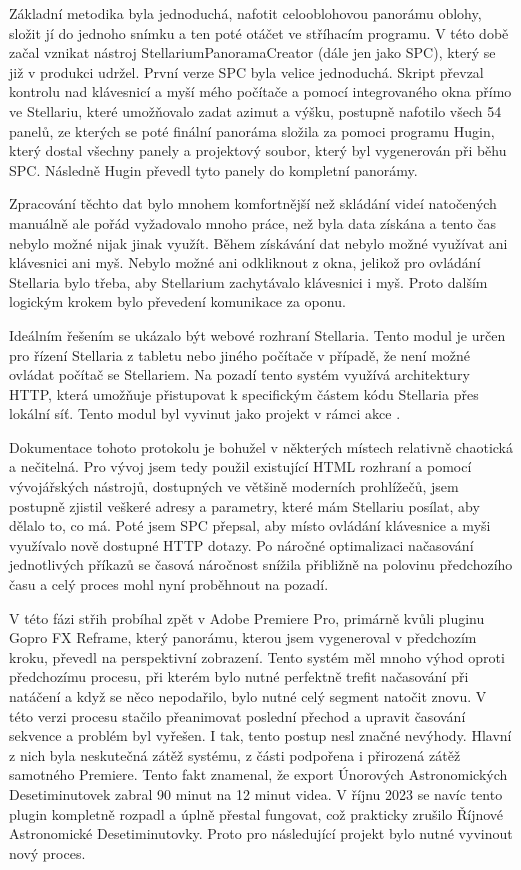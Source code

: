 \documentclass[12pt,a4paper,titlepage]{article}
\begin{document}
Základní metodika byla jednoduchá, nafotit celooblohovou panorámu oblohy, složit jí do jednoho snímku a ten poté otáčet ve stříhacím programu. V této době začal vznikat nástroj StellariumPanoramaCreator (dále jen jako SPC), který se již v produkci udržel. První verze SPC byla velice jednoduchá. Skript převzal kontrolu nad klávesnicí a myší mého počítače a pomocí integrovaného okna přímo ve Stellariu, které umožňovalo zadat azimut a výšku, postupně nafotilo všech 54 panelů, ze kterých se poté finální panoráma složila za pomoci programu Hugin, který dostal všechny panely a projektový soubor, který byl vygenerován při běhu SPC. Následně Hugin převedl tyto panely do kompletní panorámy.

Zpracování těchto dat bylo mnohem komfortnější než skládání videí natočených manuálně ale pořád vyžadovalo mnoho práce, než byla data získána a tento čas nebylo možné nijak jinak využít. Během získávání dat nebylo možné využívat ani klávesnici ani myš. Nebylo možné ani odkliknout z okna, jelikož pro ovládání Stellaria bylo třeba, aby Stellarium zachytávalo klávesnici i myš. Proto dalším logickým krokem bylo převedení komunikace za oponu. 

Ideálním řešením se ukázalo být webové rozhraní Stellaria. Tento modul je určen pro řízení Stellaria z tabletu nebo jiného počítače v případě, že není možné ovládat počítač se Stellariem. Na pozadí tento systém využívá architektury HTTP, která umožňuje přistupovat k specifickým částem kódu Stellaria přes lokální síť. Tento modul byl vyvinut jako projekt v rámci akce . 

Dokumentace tohoto protokolu je bohužel v některých místech relativně chaotická a nečitelná. Pro vývoj jsem tedy použil existující HTML rozhraní a pomocí vývojářských nástrojů, dostupných ve většině moderních prohlížečů, jsem postupně zjistil veškeré adresy a parametry, které mám Stellariu posílat, aby dělalo to, co má. Poté jsem SPC přepsal, aby místo ovládání klávesnice a myši využívalo nově dostupné HTTP dotazy. Po náročné optimalizaci načasování jednotlivých příkazů se časová náročnost snížila přibližně na polovinu předchozího času a celý proces mohl nyní proběhnout na pozadí.

V této fázi střih probíhal zpět v Adobe Premiere Pro, primárně kvůli pluginu Gopro FX Reframe, který panorámu, kterou jsem vygeneroval v předchozím kroku, převedl na perspektivní zobrazení. Tento systém měl mnoho výhod oproti předchozímu procesu, při kterém bylo nutné perfektně trefit načasování při natáčení a když se něco nepodařilo, bylo nutné celý segment natočit znovu. V této verzi procesu stačilo přeanimovat poslední přechod a upravit časování sekvence a problém byl vyřešen. I tak, tento postup nesl značné nevýhody. Hlavní z nich byla neskutečná zátěž systému, z části podpořena i přirozená zátěž samotného Premiere. Tento fakt znamenal, že export Únorových Astronomických Desetiminutovek zabral 90 minut na 12 minut videa. V říjnu 2023 se navíc tento plugin kompletně rozpadl a úplně přestal fungovat, což prakticky zrušilo Říjnové Astronomické Desetiminutovky. Proto pro následující projekt bylo nutné vyvinout nový proces. 
\end{document}
